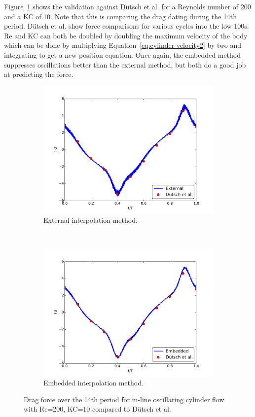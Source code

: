 \documentclass[preprint,12pt]{elsarticle}
\begin{document}
Figure~\ref{fig:KC 10} shows the validation against D\"{u}tsch et al. for a Reynolds number of 200 and a KC of 10. 
Note that this is comparing the drag dating during the 14th period. 
D\"{u}tsch et al. show force comparisons for various cycles into the low 100s.
Re and KC can both be doubled by doubling the maximum velocity of the body which can be done by multiplying Equation~\eqref{eq:cylinder velocity2} by two and integrating to get a new position equation.
Once again, the embedded method suppresses oscillations better than the external method, but both do a good job at predicting the force. 
\begin{figure}[!htb]
	\centering
	\par\medskip
	\begin{subfigure}{0.4\textwidth}
		\includegraphics[width=\linewidth]{External_static_kc10}
		\caption{External interpolation method.}
	\end{subfigure}
	~
	\begin{subfigure}{0.4\textwidth}
		\includegraphics[width=\linewidth]{Embedded_static_kc10}
		\caption{Embedded interpolation method.}
	\end{subfigure}
	\caption{Drag force over the 14th period for in-line oscillating cylinder flow with Re=200, KC=10 compared to D\"{u}tsch et al.~\cite{dutsch1998low}}
	\label{fig:KC 10}
\end{figure}
\end{document}
